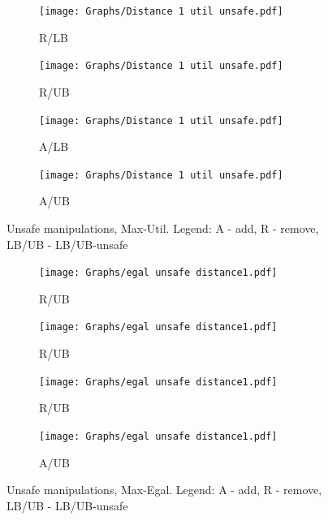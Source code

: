 \begin{figure}
    \centering
\begin{subfigure}{0.07\textwidth}
        \centering
        \texttt{[image: Graphs/Distance 1 util unsafe.pdf]}
        \caption{R/LB}
        \label{fig:distance1_util_unsafe_remove_LB_appendix}
    \end{subfigure}
    \hfill
    \begin{subfigure}{0.07\textwidth}
        \centering
        \texttt{[image: Graphs/Distance 1 util unsafe.pdf]}
        \caption{R/UB}
        \label{fig:distance1_util_unsafe_remove_UB_appendix}
    \end{subfigure}
    \hfill
    \begin{subfigure}{0.07\textwidth}
        \centering
        \texttt{[image: Graphs/Distance 1 util unsafe.pdf]}
        \caption{A/LB}
        \label{fig:distance1_util_unsafe_add_LB}
    \end{subfigure}
    \hfill
    \begin{subfigure}{0.07\textwidth}
        \centering
        \texttt{[image: Graphs/Distance 1 util unsafe.pdf]}
        \caption{A/UB}
        \label{fig:distance1_util_unsafe_add_UB}
    \end{subfigure}

    \caption{Unsafe manipulations, Max-Util. Legend: A - add, R - remove, LB/UB - LB/UB-unsafe}
    \label{fig:distance1_unsafe_util_appendix}
\end{figure}

\begin{figure}
    \centering
    \begin{subfigure}{0.07\textwidth}
        \centering
        \texttt{[image: Graphs/egal unsafe distance1.pdf]}
        \caption{R/UB}
        \label{fig:egalremove1}
    \end{subfigure}
    \hfill
    \begin{subfigure}{0.07\textwidth}
        \centering
        \texttt{[image: Graphs/egal unsafe distance1.pdf]}
        \caption{R/UB}
        \label{fig:egalremove2}
    \end{subfigure}
    \hfill
    \begin{subfigure}{0.07\textwidth}
        \centering
        \texttt{[image: Graphs/egal unsafe distance1.pdf]}
        \caption{R/UB}
        \label{fig:egalremove3}
    \end{subfigure}
    \hfill
    \begin{subfigure}{0.07\textwidth}
        \centering
        \texttt{[image: Graphs/egal unsafe distance1.pdf]}
        \caption{A/UB}
        \label{fig:egalremove4}
    \end{subfigure}

    \caption{Unsafe manipulations, Max-Egal. Legend: A - add, R - remove, LB/UB - LB/UB-unsafe}
    \label{fig:distance1_unsafe_egal}
\end{figure}

